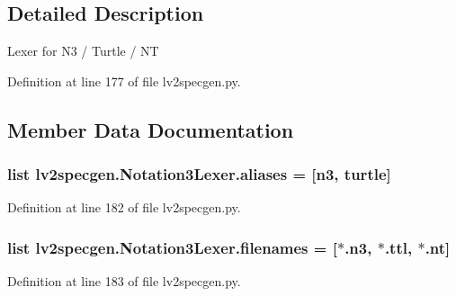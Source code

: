 \subsection{Detailed Description}
\begin{DoxyVerb}Lexer for N3 / Turtle / NT
\end{DoxyVerb}
 

Definition at line 177 of file lv2specgen.\+py.



\subsection{Member Data Documentation}
\subsubsection[{\texorpdfstring{aliases}{aliases}}]{\setlength{\rightskip}{0pt plus 5cm}list lv2specgen.\+Notation3\+Lexer.\+aliases = \mbox{[}\textquotesingle{}n3\textquotesingle{}, \textquotesingle{}turtle\textquotesingle{}\mbox{]}\hspace{0.3cm}{\ttfamily [static]}}\hypertarget{classlv2specgen_1_1_notation3_lexer_a1528810c08fc3b0ae8f3d748d9bef845}{}\label{classlv2specgen_1_1_notation3_lexer_a1528810c08fc3b0ae8f3d748d9bef845}


Definition at line 182 of file lv2specgen.\+py.

\subsubsection[{\texorpdfstring{filenames}{filenames}}]{\setlength{\rightskip}{0pt plus 5cm}list lv2specgen.\+Notation3\+Lexer.\+filenames = \mbox{[}\textquotesingle{}$\ast$.n3\textquotesingle{}, \textquotesingle{}$\ast$.ttl\textquotesingle{}, \textquotesingle{}$\ast$.nt\textquotesingle{}\mbox{]}\hspace{0.3cm}{\ttfamily [static]}}\hypertarget{classlv2specgen_1_1_notation3_lexer_ad20c31b0e8f26409410d80fc6c8051da}{}\label{classlv2specgen_1_1_notation3_lexer_ad20c31b0e8f26409410d80fc6c8051da}


Definition at line 183 of file lv2specgen.\+py.

